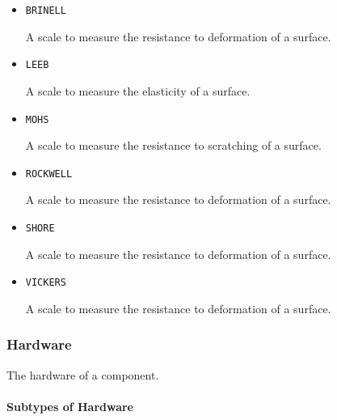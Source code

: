 \begin{itemize}

\item \texttt{BRINELL}


A scale to measure the resistance to deformation of a surface.

\item \texttt{LEEB}


A scale to measure the elasticity of a surface.

\item \texttt{MOHS}


A scale to measure the resistance to scratching of a surface.

\item \texttt{ROCKWELL}


A scale to measure the resistance to deformation of a surface.

\item \texttt{SHORE}


A scale to measure the resistance to deformation of a surface.

\item \texttt{VICKERS}


A scale to measure the resistance to deformation of a surface.


\end{itemize}









\subsubsection{Hardware}




The hardware of a component.


\paragraph{Subtypes of Hardware}\mbox{}
\label{sec:Subtypes of Hardware}

